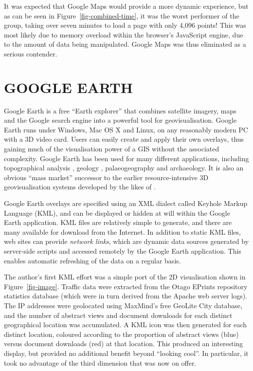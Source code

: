 \documentclass[10pt]{article}
\begin{document}
It was expected that Google Maps would provide a more dynamic experience, but as can be seen in Figure~\ref{fig-combined-time}, it was the worst performer of the group, taking over seven minutes to load a page with only 4,096 points! This was most likely due to memory overload within the browser's JavaScript engine, due to the amount of data being manipulated. Google Maps was thus eliminated as a serious contender.


\section{GOOGLE EARTH}
\label{google-earth}

Google Earth is a free ``Earth explorer'' that combines satellite imagery, maps and the Google search engine into a powerful tool for geovisualisation. Google Earth runs under Windows, Mac OS X and Linux, on any reasonably modern PC with a 3D video card. Users can easily create and apply their own overlays, thus gaining much of the visualisation power of a GIS without the associated complexity. Google Earth has been used for many different applications, including topographical analysis \cite{USGS-2006-topo}, geology \cite{Thom-K-2006-GSA,dePa-DG-2006-GSA}, palaeogeography and archaeology. It is also an obvious ``mass market'' successor to the earlier resource-intensive 3D geovisualisation systems developed by the likes of .

Google Earth overlays are specified using an XML dialect called Keyhole Markup Language (KML), and can be displayed or hidden at will within the Google Earth application. KML files are relatively simple to generate, and there are many available for download from the Internet. In addition to static KML files, web sites can provide \emph{network links}, which are dynamic data sources generated by server-side scripts and accessed remotely by the Google Earth application. This enables automatic refreshing of the data on a regular basis.

The author's first KML effort was a simple port of the 2D visualisation shown in Figure~\ref{fig-image}. Traffic data were extracted from the Otago EPrints repository statistics database (which were in turn derived from the Apache web server logs). The IP addresses were geolocated using MaxMind's free GeoLite City database, and the number of abstract views and document downloads for each distinct geographical location was accumulated. A KML icon was then generated for each distinct location, coloured according to the proportion of abstract views (blue) versus document downloads (red) at that location. This produced an interesting display, but provided no additional benefit beyond ``looking cool''. In particular, it took no advantage of the third dimension that was now on offer.
\end{document}
